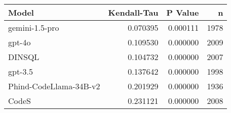 \begin{tabular}{lrrr}
\toprule
Model & Kendall-Tau & P Value & n \\
\midrule
gemini-1.5-pro & 0.070395 & 0.000111 & 1978 \\
gpt-4o & 0.109530 & 0.000000 & 2009 \\
DINSQL & 0.104732 & 0.000000 & 2007 \\
gpt-3.5 & 0.137642 & 0.000000 & 1998 \\
Phind-CodeLlama-34B-v2 & 0.201929 & 0.000000 & 1936 \\
CodeS & 0.231121 & 0.000000 & 2008 \\
\bottomrule
\end{tabular}
